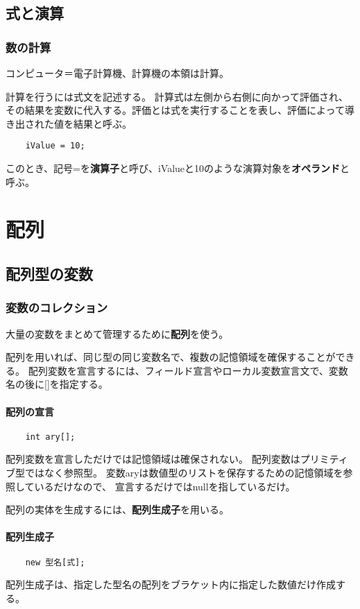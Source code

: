 \documentclass[12pt,a4j,twoside]{jsbook}
\begin{document}
\section{式と演算}
\subsection{数の計算}
コンピュータ＝電子計算機、計算機の本領は計算。

計算を行うには式文を記述する。
計算式は左側から右側に向かって評価され、その結果を変数に代入する。評価とは式を実行することを表し、評価によって導き出された値を結果と呼ぶ。
\begin{lstlisting}
    iValue = 10;
\end{lstlisting}
このとき、記号=を\textbf{演算子}と呼び、iValueと10のような演算対象を\textbf{オペランド}と呼ぶ。

\chapter{配列}
\section{配列型の変数}
\subsection{変数のコレクション}
大量の変数をまとめて管理するために\textbf{配列}を使う。

配列を用いれば、同じ型の同じ変数名で、複数の記憶領域を確保することができる。
配列変数を宣言するには、フィールド宣言やローカル変数宣言文で、変数名の後に[]を指定する。
\subsubsection*{配列の宣言}
\begin{lstlisting}
    int ary[];
\end{lstlisting}
配列変数を宣言しただけでは記憶領域は確保されない。
配列変数はプリミティブ型ではなく参照型。
変数aryは数値型のリストを保存するための記憶領域を参照しているだけなので、
宣言するだけではnullを指しているだけ。

配列の実体を生成するには、\textbf{配列生成子}を用いる。
\subsubsection*{配列生成子}
\begin{lstlisting}
    new 型名[式];
\end{lstlisting}
配列生成子は、指定した型名の配列をブラケット内に指定した数値だけ作成する。
\end{document}
